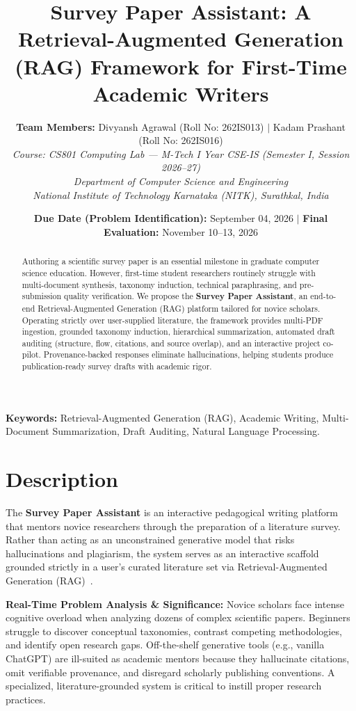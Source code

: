 \documentclass[10pt,a4paper]{article}
\title{\vspace{-1.6em}\large\textbf{Survey Paper Assistant: A Retrieval-Augmented Generation (RAG) Framework for First-Time Academic Writers}\vspace{-0.5em}}
\author{
    \textbf{Team Members:} Divyansh Agrawal (Roll No: 262IS013) \quad $|$ \quad Kadam Prashant (Roll No: 262IS016) \\
    \textit{Course: CS801 Computing Lab --- M-Tech I Year CSE-IS (Semester I, Session 2026--27)} \\
    \textit{Department of Computer Science and Engineering} \\
    \textit{National Institute of Technology Karnataka (NITK), Surathkal, India}
}
\date{\vspace{-0.5em}\small\textbf{Due Date (Problem Identification):} September 04, 2026 \quad $|$ \quad \textbf{Final Evaluation:} November 10--13, 2026\vspace{-0.8em}}
\begin{document}
\maketitle

\begin{abstract}
\noindent\small
Authoring a scientific survey paper is an essential milestone in graduate computer science education. However, first-time student researchers routinely struggle with multi-document synthesis, taxonomy induction, technical paraphrasing, and pre-submission quality verification. We propose the \textbf{Survey Paper Assistant}, an end-to-end Retrieval-Augmented Generation (RAG) platform tailored for novice scholars. Operating strictly over user-supplied literature, the framework provides multi-PDF ingestion, grounded taxonomy induction, hierarchical summarization, automated draft auditing (structure, flow, citations, and source overlap), and an interactive project co-pilot. Provenance-backed responses eliminate hallucinations, helping students produce publication-ready survey drafts with academic rigor.
\end{abstract}
\vspace{-0.35em}
\noindent\footnotesize\textbf{Keywords:} Retrieval-Augmented Generation (RAG), Academic Writing, Multi-Document Summarization, Draft Auditing, Natural Language Processing.

\section{Description}
The \textbf{Survey Paper Assistant} is an interactive pedagogical writing platform that mentors novice researchers through the preparation of a literature survey. Rather than acting as an unconstrained generative model that risks hallucinations and plagiarism, the system serves as an interactive scaffold grounded strictly in a user's curated literature set via Retrieval-Augmented Generation (RAG)~\cite{gao2024rag}.

\textbf{Real-Time Problem Analysis \& Significance:} Novice scholars face intense cognitive overload when analyzing dozens of complex scientific papers. Beginners struggle to discover conceptual taxonomies, contrast competing methodologies, and identify open research gaps. Off-the-shelf generative tools (e.g., vanilla ChatGPT) are ill-suited as academic mentors because they hallucinate citations, omit verifiable provenance, and disregard scholarly publishing conventions. A specialized, literature-grounded system is critical to instill proper research practices.
\end{document}

